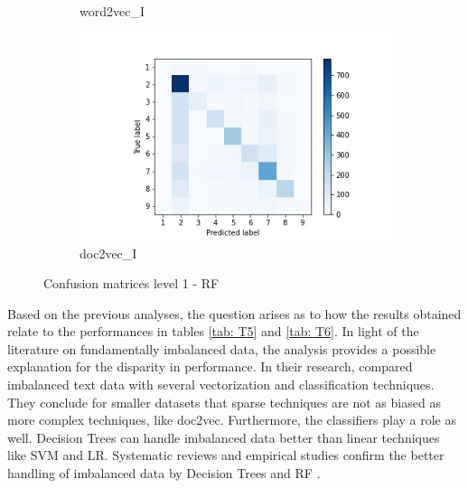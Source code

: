 \documentclass[12pt, a4paper, titlepage]{article}
\begin{document}
\begin{figure}
\begin{subfigure}[b]{0.475\textwidth}
    {{\small word2vec\_I}}    
  \end{subfigure}
  \hfill
  \begin{subfigure}[b]{0.475\textwidth}   
      \centering 
      \includegraphics[width=\textwidth]{cm_doc2vec_without_RF.jpg}
      {{\small doc2vec\_I}}    
  \end{subfigure}
  \caption{\label{fig: F20} Confusion matrices level 1 - RF}
\end{figure}

Based on the previous analyses, the question arises as to how the results obtained relate to the performances in tables \ref{tab: T5} and \ref{tab: T6}. In light of the literature on fundamentally imbalanced data, the analysis provides a possible explanation for the disparity in performance. In their research, \citet{padurariu2019} compared imbalanced text data with several vectorization and classification techniques. They conclude for smaller datasets that sparse techniques are not as biased as more complex techniques, like doc2vec. Furthermore, the classifiers play a role as well. Decision Trees can handle imbalanced data better than linear techniques like \ac{SVM} and \ac{LR}. Systematic reviews and empirical studies confirm the better handling of imbalanced data by Decision Trees and \ac{RF} \citep{kaur2019, muchlinski2016, krawczyk2016}. 
\end{document}
